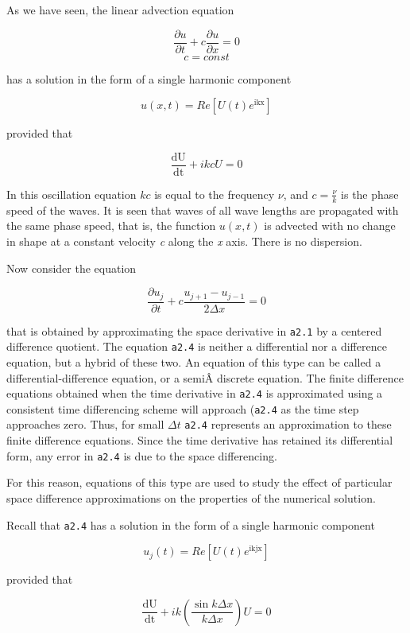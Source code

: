 As we have seen, the linear advection equation

{\[\frac{\partial u}{\partial t} + c\frac{\partial u}{\partial x} = 0\]\[c = const\]}

has a solution in the form of a single harmonic component

{\[u\left( x,t \right) = Re\left\lbrack U\left( t \right)e^{\text{ikx}} \right\rbrack\]}

provided that

{\[\frac{\text{dU}}{\text{dt}} + ikcU = 0\]}

In this oscillation equation \(kc\) is equal to the frequency \(\nu\),
and \(c = \frac{\nu}{k}\) is the phase speed of the waves. It is seen
that waves of all wave lengths are propagated with the same phase speed,
that is, the function \(u\left( x,t \right)\) is advected with no change
in shape at a constant velocity \emph{c} along the \emph{x} axis. There
is no dispersion.

Now consider the equation

{\[\frac{{\partial u}_{j}}{\partial t} + c\frac{u_{j + 1} - u_{j - 1}}{2\Delta x} = 0\]}

that is obtained by approximating the space derivative in \texttt{a2.1}
by a centered difference quotient. The equation \texttt{a2.4} is neither
a differential nor a difference equation, but a hybrid of these two. An
equation of this type can be called a differential-difference equation,
or a semiÂ­ discrete equation. The finite difference equations obtained
when the time derivative in \texttt{a2.4} is approximated using a
consistent time differencing scheme will approach (\texttt{a2.4} as the
time step approaches zero. Thus, for small \(\Delta t\) \texttt{a2.4}
represents an approximation to these finite difference equations. Since
the time derivative has retained its differential form, any error in
\texttt{a2.4} is due to the space differencing.

For this reason, equations of this type are used to study the effect of
particular space difference approximations on the properties of the
numerical solution.

Recall that \texttt{a2.4} has a solution in the form of a single
harmonic component

{\[u_{j}\left( t \right) = Re\left\lbrack U\left( t \right)e^{\text{ikjx}} \right\rbrack\]}

provided that

{\[\frac{\text{dU}}{\text{dt}} + ik\left( \frac{\sin{k\Delta x}}{k\Delta x} \right)U = 0\]}

